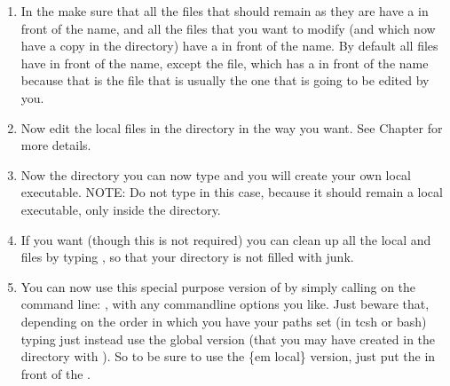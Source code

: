 \documentclass[letterpaper,10pt,english]{sphinxmanual}
\begin{document}
\begin{itemize}
\begin{enumerate}
\item {} 
In the  make sure that all the
 files that should remain as they are have a 
in front of the name, and all the  files that
you want to modify (and which now have a copy in the 
directory) have a  in front of the name. By
default all  files have  in front of
the name, except the  file, which has a
 in front of the name because that is the file that is
usually the one that is going to be edited by you.

\item {} 
Now edit the local  files in the  directory
in the way you want. See Chapter {\hyperref[\detokenize{internalsetup:chap-internal-setup}]{}} for more details.

\item {} 
Now  the  directory you can now type
 and you will create your own local  executable.
NOTE: Do not type  in this case, because it should
remain a local executable, only inside the  directory.

\item {} 
If you want (though this is not required) you can clean up all the
local  and  files by typing , so that your  directory is not filled
with junk.

\item {} 
You can now use this special purpose version of 
by simply calling on the command line: , with any
command\sphinxhyphen{}line options you like. Just beware that, depending on the order
in which you have your paths set (in tcsh or bash) typing just
  instead use the global version (that you
may have created in the  directory with ). So to be sure to use the \{em local\} version, just put the
 in front of the .

\end{enumerate}

\end{itemize}
\end{document}
